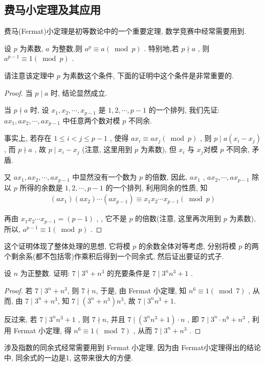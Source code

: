 \subsection{费马小定理及其应用}
费马(Fermat)小定理是初等数论中的一个重要定理, 数学竞赛中经常需要用到.
\begin{theorem}
	设 $p$ 为素数, $a$ 为整数,则 $a^{p} \equiv a(\bmod p)$ . 特别地,若 $p \nmid a$ , 则 $a^{p-1} \equiv 1(\bmod p)$ .
\end{theorem}
请注意该定理中 $p$ 为素数这个条件, 下面的证明中这个条件是非常重要的.
\begin{proof}
	当 $p \mid a$ 时, 结论显然成立.

	当 $p \nmid a$ 时, 设 $x_{1}, x_{2}, \cdots, x_{p-1}$ 是 $1,2, \cdots, p-1$ 的一个排列, 我们先证:  $a x_{1}, a x_{2}, \cdots, a x_{p-1}$ 中任意两个数对模 $p$ 不同余.

	事实上, 若存在 $1 \leqslant i<j \leqslant p-1$ , 使得 $a x_{i} \equiv a x_{j}(\bmod p)$ , 则 $p \mid a\left(x_{i}-x_{j}\right)$ , 而 $p \nmid a$ , 故 $p \mid x_{i}-x_{j}$ (注意, 这里用到 $p$ 为素数), 但 $x_{i}$ 与 $x_{j}$对模 $p$ 不同余, 矛盾.

	又 $a x_{1}, a x_{2}, \cdots, a x_{p-1}$ 中显然没有一个数为 $p$ 的倍数, 因此,  $a x_{1}$ ,  $a x_{2}, \cdots, a x_{p-1}$ 除以 $p$ 所得的余数是 $1,2, \cdots, p-1$ 的一个排列, 利用同余的性质, 知
	\begin{align*}
		\left(a x_{1}\right)\left(a x_{2}\right) \cdots\left(a x_{p-1}\right) \equiv x_{1} x_{2} \cdots x_{p-1}(\bmod p)
	\end{align*}

	再由 $x_{1} x_{2} \cdots x_{p-1}=(p-1)$ , , 它不是 $p$ 的倍数(注意, 这里再次用到 $p$ 为素数), 所以,  $a^{p-1} \equiv 1(\bmod p)$ .
\end{proof}
\begin{note}
	这个证明体现了整体处理的思想, 它将模 $p$ 的余数全体对等考虑, 分别将模 $p$ 的两个剩余系(都不包括零)作乘积后得到一个同余式, 然后证出要证的式子.
\end{note}

\begin{example}
	设 $n$ 为正整数. 证明: $7 \mid 3^{n}+n^{3}$ 的充要条件是 $7 \mid 3^{n} n^{3}+1$ .
\end{example}
\begin{proof}
	若 $7 \mid 3^{n}+n^{3}$, 则 $7\nmid n$, 于是, 由 Fermat 小定理, 知 $n^{6} \equiv 1(\bmod 7)$ ,
	从而, 由
	$7 \mid 3^{n}+n^{3}$,
	知
	$7 \mid\left(3^{n}+n^{3}\right) n^{3}$,
	故
	$7 \mid 3^{n} n^{3}+1$.

	反过来, 若 $7 \mid 3^{n} n^{3}+1$ ,
	则 $7 \nmid n$,
	并且 $7 \mid (3^{n} n^{3}+1)\cdot n$ ,
	即 $7 \mid 3^{n} \cdot n^6 + n^3$ ,
	利用 Fermat 小定理, 得 $ n^6 \equiv 1(\bmod 7)$ ,
	从而 $7 \mid 3^{n}+n^{3}$ .
\end{proof}
\begin{note}
	涉及指数的同余式经常需要用到 Fermat 小定理, 因为由 Fermat小定理得出的结论中, 同余式的一边是1, 这带来很大的方便.
\end{note}

